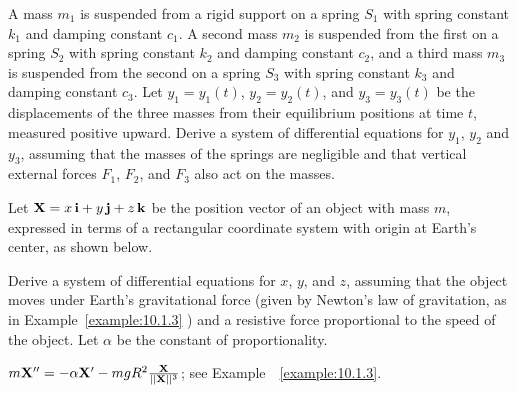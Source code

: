 \documentclass{ximera}
\begin{document}
\begin{problem}\label{exer:10.1.3}
A mass $m_1$ is suspended from a rigid support on a spring $S_1$ with
spring constant $k_1$ and damping constant $c_1$. A second mass $m_2$
is suspended from the first on a spring $S_2$ with spring constant
$k_2$ and damping constant $c_2$, and a third mass $m_3$ is suspended
from the second on a spring $S_3$ with spring constant $k_3$ and
damping
constant $c_3$. Let $y_1=y_1(t)$, $y_2=y_2(t)$, and $y_3=y_3(t)$ be the
displacements of the three masses from their equilibrium positions at
time $t$, measured positive upward. Derive a system of differential
equations for $y_1$, $y_2$ and $y_3$, assuming that the masses of the
springs are negligible and that vertical external forces $F_1$, $F_2$,
and
$F_3$ also act on the masses.
\end{problem}

\begin{problem}\label{exer:10.1.4}
Let ${\bf X}=x\,{\bf i}+y\,{\bf j}+z\,{\bf k}$ be the position vector
of an object with mass $m$, expressed in terms of a rectangular
coordinate system with origin at Earth's center, as shown below. 

\begin{center}
\end{center}

Derive a system of differential equations for
$x$, $y$, and $z$, assuming that the object moves under Earth's
gravitational force (given by Newton's law of gravitation, as in
Example~\ref{example:10.1.3} ) and a resistive force proportional to the
speed of the object. Let $\alpha$ be the constant of proportionality.

\begin{solution}
    $m{\bf X}''=-\alpha{\bf X'}-mgR^2\frac{{\bf X}}{||{\bf X}||^3}$;
see Example~~\ref{example:10.1.3}.
\end{solution}
\end{problem}
\end{document}
